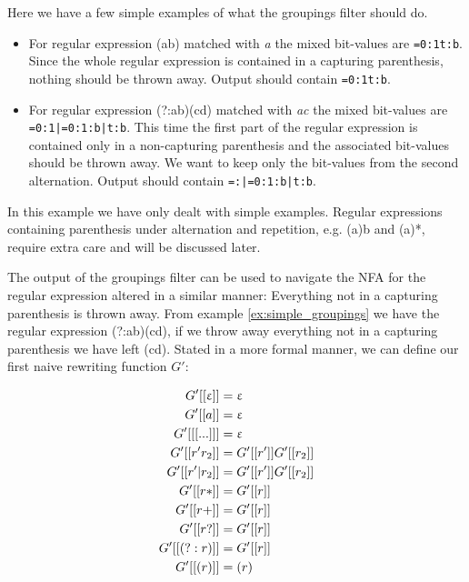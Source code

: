 \begin{example}
  \label{ex:simple_groupings}
  Here we have a few simple examples of what the groupings filter
  should do. 
  \begin{itemize}
  \item
    For regular expression \textsf{(a\textbar b)} matched with
    \textsl{a} the mixed bit-values are \texttt{=0:1\textbar t:b}. Since
    the whole regular expression is contained in a capturing
    parenthesis, nothing should be thrown away. Output should contain
    \texttt{=0:1\textbar t:b}.
  \item
    For regular expression \textsf{(?:a\textbar b)(c\textbar d)} matched
    with \textsl{ac} the mixed bit-values are
    \texttt{=0:1|=0:1:b|t:b}. This time the first part of the regular
    expression is contained only in a non-capturing parenthesis and the
    associated bit-values should be thrown away. We want to keep only the
    bit-values from the second alternation. Output should contain
    \texttt{=:|=0:1:b|t:b}.
  \end{itemize}
  
  In this example we have only dealt with simple examples. Regular
  expressions containing parenthesis under alternation and repetition,
  e.g. \textsf{(a)\textbar b} and \textsf{(a)*}, require extra care
  and will be discussed later.
\end{example}

The output of the groupings filter can be used to navigate the NFA for
the regular expression altered in a similar manner: Everything not in
a capturing parenthesis is thrown away. From example
\vref{ex:simple_groupings} we have the regular expression
\textsf{(?:a\textbar b)(c\textbar d)}, if we throw away everything not
in a capturing parenthesis we have left \textsf{(c\textbar d)}. Stated
in a more formal manner, we can define our first naive rewriting
function $G'$:

\begin{align}
  G'[[\upvarepsilon]] &= \upvarepsilon \notag\\
  G'[[a]] &= \upvarepsilon \notag\\
  G'[[ [...] ]] &= \upvarepsilon \notag\\
  G'[[r'r_2]] &= G'[[r']]G'[[r_2]] \notag\\
  G'[[r'|r_2]] &= G'[[r']]G'[[r_2]] \notag\\
  G'[[r*]] &= G'[[r]] \notag\\
  G'[[r+]] &= G'[[r]] \notag\\
  G'[[r?]] &= G'[[r]] \notag\\
  G'[[(?:r)]] &= G'[[r]] \label{eq:G1_paren}\\
  G'[[(r)]] &= (r) \notag
\end{align}

